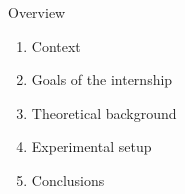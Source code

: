 \documentclass[../defence.tex]{subfiles}
\begin{document}
  \begin{frame}{Overview}
      \begin{enumerate}
        \item Context
        \item Goals of the internship
        \item Theoretical background
        \item Experimental setup
        \item Conclusions
      \end{enumerate}
  \end{frame}
\end{document}
